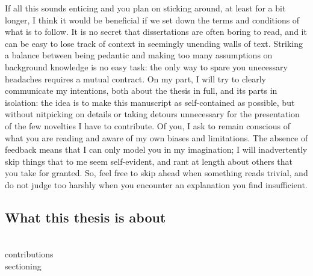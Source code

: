 If all this sounds enticing and you plan on sticking around, at least for a bit longer, I think it would be beneficial if we set down the terms and conditions of what is to follow. 
It is no secret that dissertations are often boring to read, and it can be easy to lose track of context in seemingly unending walls of text. 
Striking a balance between being pedantic and making too many assumptions on background knowledge is no easy task: the only way to spare you unecessary headaches requires a mutual contract. 
On my part, I will try to clearly communicate my intentions, both about the thesis in full, and its parts in isolation: the idea is to make this manuscript as self-contained as possible, but without nitpicking on details or taking detours unnecessary for the presentation of the few novelties I have to contribute.
Of you, I ask to remain conscious of what you are reading and aware of my own biases and limitations. 
The absence of feedback means that I can only model you in my imagination; 
I will inadvertently skip things that to me seem self-evident, and rant at length about others that you take for granted.
So, feel free to skip ahead when something reads trivial, and do not judge too harshly when you encounter an explanation you find insufficient.

\subsection*{What this thesis is about}
\todo \\
contributions \\
sectioning \\ 

%
